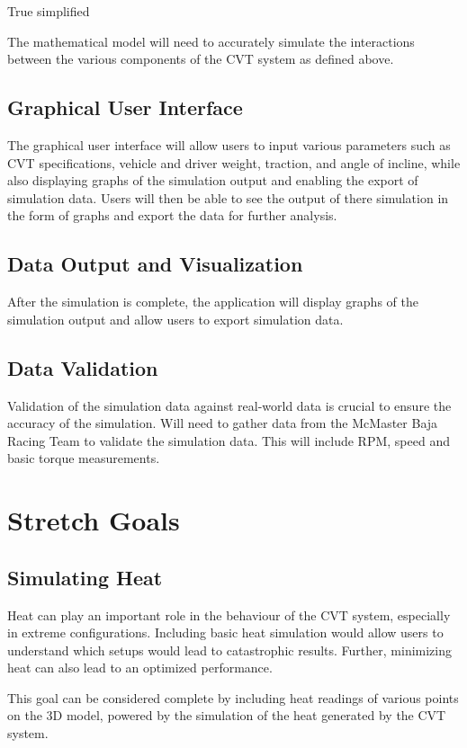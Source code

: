 \documentclass{article}
\begin{document}
True simplified

The mathematical model will need to accurately simulate the interactions between the various
components of the CVT system as defined above.

\subsection{Graphical User Interface}
The graphical user interface will allow users to input various parameters such as CVT specifications, vehicle and driver weight, traction, and angle of incline, while also displaying graphs of the simulation output and enabling the export of simulation data. 
Users will then be able to see the output of there simulation in the form of graphs and export the data for further analysis. 

\subsection{Data Output and Visualization}
After the simulation is complete, the application will display graphs of the simulation output 
and allow users to export simulation data.

\subsection{Data Validation}
Validation of the simulation data against real-world data is crucial to ensure the accuracy of 
the simulation. Will need to gather data from the McMaster Baja Racing Team to validate the 
simulation data. This will include RPM, speed and basic torque measurements.

\section{Stretch Goals}
\subsection{Simulating Heat}
Heat can play an important role in the behaviour of the CVT system, especially in extreme 
configurations. Including basic heat simulation would allow users to understand which
setups would lead to catastrophic results. Further, minimizing heat can also lead to an optimized
performance.

This goal can be considered complete by including heat readings of various points on the 3D 
model, powered by the simulation of the heat generated by the CVT system.
\end{document}
